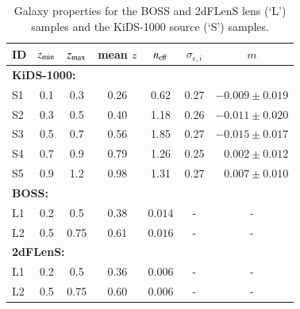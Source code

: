 \begin{appendix}
\begin{table}
\caption{Galaxy properties for the BOSS and 2dFLenS lens (\lq L\rq) samples and the KiDS-1000 source (\lq S\rq) samples.}              %
\label{tab:datatab}      %
\centering                                      %
\begin{tabular}{lcccccr}          %
\toprule
ID & $z_{\rm min}$ &  $z_{\rm max}$& mean $z$ & $n_{\rm eff}$ & $\sigma_{\epsilon,i}$ & \multicolumn{1}{c}{$m$}\\    %
\midrule
\multicolumn{6}{l}{\bf KiDS-1000:}\\  
S1 & 0.1 & 0.3 & 0.26 & 0.62 &  0.27 & $-0.009\pm0.019$\\
S2 & 0.3 & 0.5 & 0.40 & 1.18 &  0.26 & $-0.011\pm0.020$\\
S3 & 0.5 & 0.7 & 0.56 & 1.85 &  0.27 & $-0.015\pm0.017$\\
S4 & 0.7 & 0.9 & 0.79 & 1.26 &  0.25 & $0.002\pm0.012$\\
S5 & 0.9 & 1.2 & 0.98 & 1.31 &  0.27 & $0.007\pm0.010$\\
\midrule      
\multicolumn{6}{l}{\bf BOSS:}\\                             %
L1 & 0.2 & 0.5 & 0.38 & $0.014$ & -  & \multicolumn{1}{c}{-}\\
L2 & 0.5 & 0.75 & 0.61 & $0.016$ & -  & \multicolumn{1}{c}{-}\\
\midrule      
\multicolumn{6}{l}{\bf 2dFLenS:}\\                                %
L1 & 0.2 & 0.5 & 0.36 & $0.006$ & - & \multicolumn{1}{c}{-}\\
L2 & 0.5 & 0.75 & 0.60 & $0.006$ & - & \multicolumn{1}{c}{-}\\
\bottomrule
\end{tabular}
\end{table}



\end{appendix}
